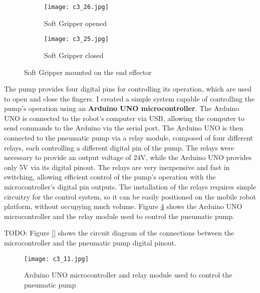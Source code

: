 \begin{figure}[t]
    \centering
    \begin{subfigure}{0.45\textwidth}
        \texttt{[image: c3\_26.jpg]}
        \caption{Soft Gripper opened}
        \label{fig:opened}
    \end{subfigure}
    \hfill %
    \begin{subfigure}{0.45\textwidth}
        \texttt{[image: c3\_25.jpg]}
        \caption{Soft Gripper closed}
        \label{fig:closed}
    \end{subfigure}
    \caption{Soft Gripper mounted on the end effector}
    \label{fig:sg_combined}
\end{figure}


The pump provides four digital pins for controlling its operation, which are used to open and close the fingers.
I created a simple system capable of controlling the pump's operation using an \textbf{Arduino UNO microcontroller}.
The Arduino UNO is connected to the robot's computer via USB, allowing the computer to send commands to the Arduino
via the serial port. The Arduino UNO is then connected to the pneumatic pump via a relay module,
composed of four different relays, each controlling a different digital pin of the pump. The relays were necessary
to provide an output voltage of $24$V, while the Arduino UNO provides only 5V via its digital pinout.
The relays are very inexpensive and fast in switching, allowing efficient
control of the pump's operation with the microcontroller's digital pin outputs.
The installation of the relays requires simple circuitry for the control system, so it can be easily positioned
on the mobile robot platform, without occupying much volume.
Figure \ref{fig:c3_img10} shows the Arduino UNO microcontroller and the relay module used to control the pneumatic pump.

TODO: Figure \ref{} shows the circuit diagram of the connections between the microcontroller 
and the pneumatic pump digital pinout.

\begin{figure}[t]
    \centering
    \texttt{[image: c3\_11.jpg]}
    \captionsetup{width=1\linewidth}
    \caption{Arduino UNO microcontroller and relay module used to control the pneumatic pump}
    \label{fig:c3_img10}
\end{figure}

